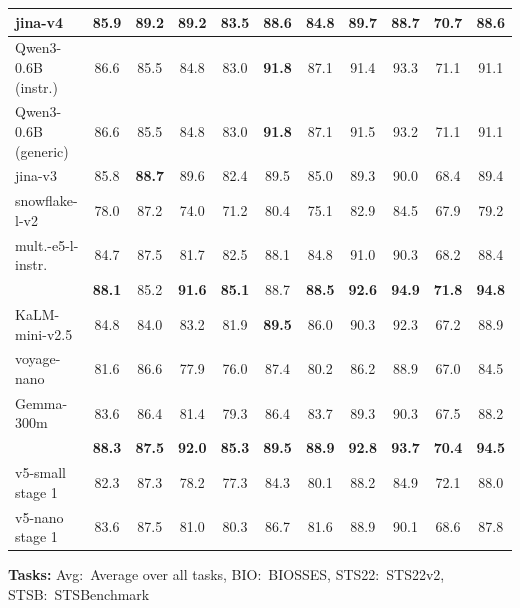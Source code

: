 \documentclass[11pt]{article}
\begin{document}
\begin{table}[H]
\begin{tabular}{l*{10}{c}}
jina-v4 & 85.9 & \textbf{89.2} & \textbf{89.2} & 83.5 & 88.6 & 84.8 & 89.7 & 88.7 & 70.7 & 88.6 \\
\midrule
Qwen3-0.6B (instr.) & 86.6 & 85.5 & 84.8 & 83.0 & \textbf{91.8} & 87.1 & 91.4 & 93.3 & 71.1 & 91.1 \\
Qwen3-0.6B (generic) & 86.6 & 85.5 & 84.8 & 83.0 & \textbf{91.8} & 87.1 & 91.5 & 93.2 & 71.1 & 91.1 \\
jina-v3 & 85.8 & \textbf{88.7} & 89.6 & 82.4 & 89.5 & 85.0 & 89.3 & 90.0 & 68.4 & 89.4 \\
snowflake-l-v2 & 78.0 & 87.2 & 74.0 & 71.2 & 80.4 & 75.1 & 82.9 & 84.5 & 67.9 & 79.2 \\
mult.-e5-l-instr. & 84.7 & 87.5 & 81.7 & 82.5 & 88.1 & 84.8 & 91.0 & 90.3 & 68.2 & 88.4 \\
\JEmbeddingVFiveTextSmallShort{} & \textbf{88.1} & 85.2 & \textbf{91.6} & \textbf{85.1} & 88.7 & \textbf{88.5} & \textbf{92.6} & \textbf{94.9} & \textbf{71.8} & \textbf{94.8} \\
\midrule
KaLM-mini-v2.5 & 84.8 & 84.0 & 83.2 & 81.9 & \textbf{89.5} & 86.0 & 90.3 & 92.3 & 67.2 & 88.9 \\
voyage-nano & 81.6 & 86.6 & 77.9 & 76.0 & 87.4 & 80.2 & 86.2 & 88.9 & 67.0 & 84.5 \\
Gemma-300m & 83.6 & 86.4 & 81.4 & 79.3 & 86.4 & 83.7 & 89.3 & 90.3 & 67.5 & 88.2 \\
\JEmbeddingVFiveTextNanoShort{} & \textbf{88.3} & \textbf{87.5} & \textbf{92.0} & \textbf{85.3} & \textbf{89.5} & \textbf{88.9} & \textbf{92.8} & \textbf{93.7} & \textbf{70.4} & \textbf{94.5} \\
\midrule
v5-small stage 1 & 82.3 & 87.3 & 78.2 & 77.3 & 84.3 & 80.1 & 88.2 & 84.9 & 72.1 & 88.0 \\
v5-nano stage 1 & 83.6 & 87.5 & 81.0 & 80.3 & 86.7 & 81.6 & 88.9 & 90.1 & 68.6 & 87.8 \\
\bottomrule
\end{tabular}
\begin{flushleft}
\textbf{Tasks:} Avg:~Average over all tasks,  BIO:~BIOSSES, STS22:~STS22v2, STSB:~STSBenchmark \\
\end{flushleft}
\end{table}
\end{document}
